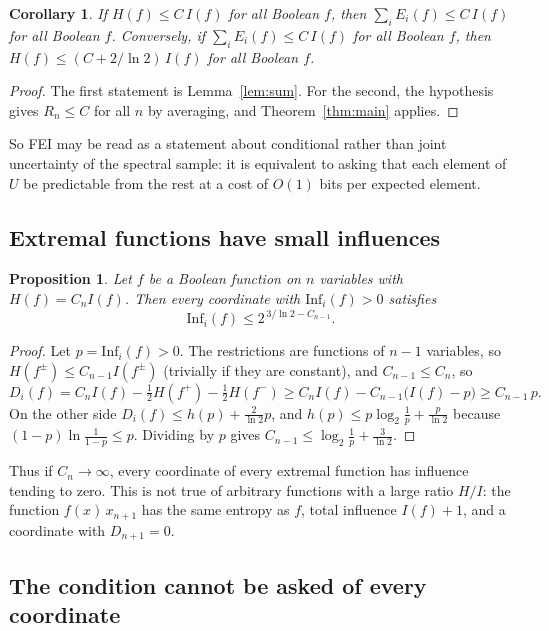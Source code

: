 \documentclass[11pt]{amsart}
\newtheorem{corollary}[theorem]{Corollary}
\newtheorem{proposition}[theorem]{Proposition}
\theoremstyle{remark}
\newcommand{\Inf}{\mathrm{Inf}}
\begin{document}
\begin{corollary}\label{cor:pl}
If $H(f)\le C\,I(f)$ for all Boolean $f$, then $\sum_iE_i(f)\le C\,I(f)$ for all Boolean $f$. Conversely, if
$\sum_iE_i(f)\le C\,I(f)$ for all Boolean $f$, then $H(f)\le(C+2/\ln 2)\,I(f)$ for all Boolean $f$.
\end{corollary}

\begin{proof}
The first statement is Lemma~\ref{lem:sum}. For the second, the hypothesis gives $R_n\le C$ for all $n$ by averaging,
and Theorem~\ref{thm:main} applies.
\end{proof}

So FEI may be read as a statement about conditional rather than joint uncertainty of the spectral sample: it is
equivalent to asking that each element of $U$ be predictable from the rest at a cost of $O(1)$ bits per expected
element.

\subsection*{Extremal functions have small influences}

\begin{proposition}\label{prop:ext}
Let $f$ be a Boolean function on $n$ variables with $H(f)=C_nI(f)$. Then every
coordinate with $\Inf_i(f)>0$ satisfies
\[
\Inf_i(f)\le 2^{\,3/\ln 2-C_{n-1}}.
\]
\end{proposition}

\begin{proof}
Let $p=\Inf_i(f)>0$. The restrictions are functions of $n-1$ variables, so $H(f^{\pm})\le C_{n-1}I(f^{\pm})$
(trivially if they are constant), and $C_{n-1}\le C_n$, so
\[
D_i(f)=C_nI(f)-\tfrac12H(f^+)-\tfrac12H(f^-)\ge C_nI(f)-C_{n-1}\bigl(I(f)-p\bigr)\ge C_{n-1}\,p .
\]
On the other side $D_i(f)\le h(p)+\frac2{\ln2}p$, and $h(p)\le p\log_2\frac1p+\frac{p}{\ln 2}$ because
$(1-p)\ln\frac1{1-p}\le p$. Dividing by $p$ gives $C_{n-1}\le\log_2\frac1p+\frac3{\ln2}$.
\end{proof}

Thus if $C_n\to\infty$, every coordinate of every extremal function has influence tending to zero. This is not true
of arbitrary functions with a large ratio $H/I$: the function $f(x)\,x_{n+1}$ has the same entropy as $f$, total
influence $I(f)+1$, and a coordinate with $D_{n+1}=0$.

\subsection*{The condition cannot be asked of every coordinate}
\end{document}
